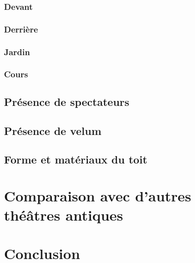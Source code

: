 			\subsection{Devant}
			\subsection{Derrière}
			\subsection{Jardin}
			\subsection{Cours}
		\section{Présence de spectateurs}
		\section{Présence de velum}
		\section{Forme et matériaux du toit}
		
		\newpage

	\chapter{Comparaison avec d'autres théâtres antiques}
		\minitoc
		\newpage
	
	\chapter*{Conclusion}
	
		\newpage
		
 
 
